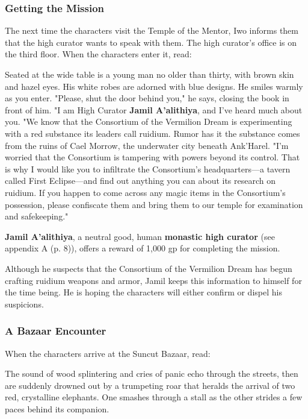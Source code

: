\documentclass[a4paper, 11pt, bg=full, twocolumn, nooutline]{dndbook}
\begin{document}
\subsubsection{Getting the Mission}

The next time the characters visit the Temple of the Mentor, Iwo informs them that the high curator wants to speak with them. The high curator's office is on the third floor. When the characters enter it, read:

\begin{DndReadAloud}
Seated at the wide table is a young man no older than thirty, with brown skin and hazel eyes. His white robes are adorned with blue designs.
He smiles warmly as you enter. "Please, shut the door behind you," he says, closing the book in front of him. "I am High Curator \textbf{Jamil A'alithiya}, and I've heard much about you.
"We know that the Consortium of the Vermilion Dream is experimenting with a red substance its leaders call ruidium. Rumor has it the substance comes from the ruins of Cael Morrow, the underwater city beneath Ank'Harel.
"I'm worried that the Consortium is tampering with powers beyond its control. That is why I would like you to infiltrate the Consortium's headquarters---a tavern called First Eclipse---and find out anything you can about its research on ruidium. If you happen to come across any magic items in the Consortium's possession, please confiscate them and bring them to our temple for examination and safekeeping."
\end{DndReadAloud}

\textbf{Jamil A'alithiya}, a neutral good, human \textbf{monastic high curator} (see appendix A (p. 8)), offers a reward of 1,000 gp for completing the mission.

Although he suspects that the Consortium of the Vermilion Dream has begun crafting ruidium weapons and armor, Jamil keeps this information to himself for the time being. He is hoping the characters will either confirm or dispel his suspicions.

\subsubsection{A Bazaar Encounter}

When the characters arrive at the Suncut Bazaar, read:

\begin{DndReadAloud}
The sound of wood splintering and cries of panic echo through the streets, then are suddenly drowned out by a trumpeting roar that heralds the arrival of two red, crystalline elephants. One smashes through a stall as the other strides a few paces behind its companion.
\end{DndReadAloud}
\end{document}
